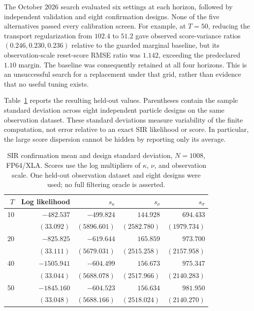 The October 2026 search evaluated six settings at each horizon, followed by
independent validation and eight confirmation designs. None of the five
alternatives passed every calibration screen. For example, at $T=50$,
reducing the transport regularization from $102.4$ to $51.2$ gave observed
score-variance ratios $(0.246,0.230,0.236)$ relative to the guarded marginal
baseline, but its observation-scale reset-score RMSE ratio was $1.142$,
exceeding the predeclared $1.10$ margin. The baseline was consequently retained
at all four horizons. This is an unsuccessful search for a replacement under
that grid, rather than evidence that no useful tuning exists.

Table~\ref{tab:bf-hd-sir-tuning-confirmation} reports the resulting held-out
values. Parentheses contain the sample standard deviation across eight
independent particle designs on the same observation dataset. These
standard deviations measure variability of the finite computation, not
error relative to an exact SIR likelihood or score. In particular, the large
score dispersion cannot be hidden by reporting only its average.
\begin{table}[htbp]
 \centering
 \small
 \setlength{\tabcolsep}{5pt}
 \begin{tabular}{rrrrr}
  \hline
  $T$ & Log likelihood & $s_{\kappa}$ & $s_{\nu}$ & $s_{\sigma}$ \\
  \hline
  10 & $-482.537$ & $-499.824$ & $144.928$ & $694.433$ \\
     & $(33.092)$ & $(5896.601)$ & $(2582.780)$ & $(1979.734)$ \\
  20 & $-825.825$ & $-619.644$ & $165.859$ & $973.700$ \\
     & $(33.111)$ & $(5679.031)$ & $(2515.258)$ & $(2157.958)$ \\
  40 & $-1505.941$ & $-604.499$ & $156.673$ & $975.347$ \\
     & $(33.044)$ & $(5688.078)$ & $(2517.966)$ & $(2140.283)$ \\
  50 & $-1845.160$ & $-604.523$ & $156.634$ & $981.950$ \\
     & $(33.048)$ & $(5688.166)$ & $(2518.024)$ & $(2140.270)$ \\
  \hline
 \end{tabular}
 \caption{SIR confirmation mean and design standard deviation, $N=1008$,
 FP64/XLA. Scores use the log multipliers of $\kappa$, $\nu$, and observation
 scale. One held-out observation dataset and eight designs were used; no
 full filtering oracle is asserted.}
 \label{tab:bf-hd-sir-tuning-confirmation}
\end{table}


